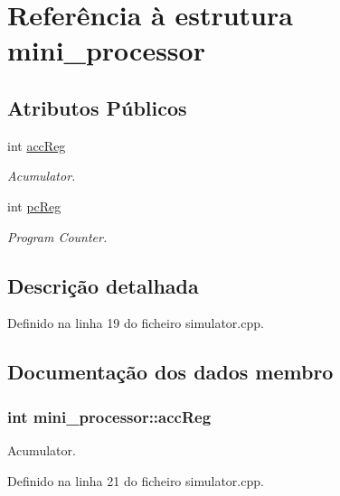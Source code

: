 \hypertarget{structmini__processor}{\section{Referência à estrutura mini\-\_\-processor}
\label{structmini__processor}
}
\subsection*{Atributos Públicos}
\begin{DoxyCompactItemize}
\item 
int \hyperlink{structmini__processor_a61644acfb57f29fd54a7d4bee6e96c02}{acc\-Reg}
\begin{DoxyCompactList}\small\item\em Acumulator. \end{DoxyCompactList}\item 
int \hyperlink{structmini__processor_aac30fbd95b117116b55aa77b9200c2c1}{pc\-Reg}
\begin{DoxyCompactList}\small\item\em Program Counter. \end{DoxyCompactList}\end{DoxyCompactItemize}


\subsection{Descrição detalhada}


Definido na linha 19 do ficheiro simulator.\-cpp.



\subsection{Documentação dos dados membro}
\hypertarget{structmini__processor_a61644acfb57f29fd54a7d4bee6e96c02}{
\subsubsection[{acc\-Reg}]{\setlength{\rightskip}{0pt plus 5cm}int mini\-\_\-processor\-::acc\-Reg}}\label{structmini__processor_a61644acfb57f29fd54a7d4bee6e96c02}


Acumulator. 



Definido na linha 21 do ficheiro simulator.\-cpp.

